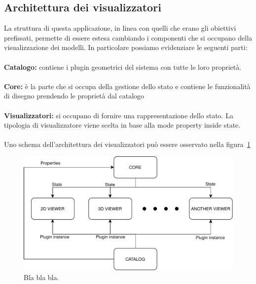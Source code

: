 \subsection{Architettura dei visualizzatori}

La struttura di questa applicazione, in linea con quelli che erano gli obiettivi prefissati, permette di essere estesa cambiando i componenti che si occupano della visualizzazione dei modelli. In particolare possiamo evidenziare le seguenti parti:\\\\
\textbf{Catalogo:} contiene i plugin geometrici del sistema con tutte le loro proprietà.\\\\
\textbf{Core:} è la parte che si occupa della gestione dello stato e contiene le funzionalità di disegno prendendo le proprietà dal catalogo\\\\
\textbf{Visualizzatori:} si occupano di fornire una rappresentazione dello stato. La tipologia di visualizzatore viene scelta in base alla mode property inside state.\\\\

Uno schema dell'architettura dei visualizzatori pu\`o essere osservato nella figura~\ref{fig_visualizators}
\begin{figure}[!t]
\centering
\includegraphics[width=\linewidth]{contents/images/diagramma-visualizzatori}

\caption{Bla bla bla.}
\label{fig_visualizators}
\end{figure}